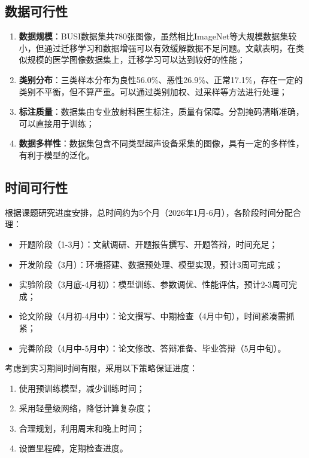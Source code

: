 \documentclass[supercite]{Hust-undergraduate-kaiti}
\theoremstyle{definition}
\begin{document}
\subsection{数据可行性}

\begin{enumerate}
    \item \textbf{数据规模}：BUSI数据集共780张图像，虽然相比ImageNet等大规模数据集较小，但通过迁移学习和数据增强可以有效缓解数据不足问题。文献表明，在类似规模的医学图像数据集上，迁移学习可以达到较好的性能；
    
    \item \textbf{类别分布}：三类样本分布为良性56.0\%、恶性26.9\%、正常17.1\%，存在一定的类别不平衡，但不算严重。可以通过类别加权、过采样等方法进行处理；
    
    \item \textbf{标注质量}：数据集由专业放射科医生标注，质量有保障。分割掩码清晰准确，可以直接用于训练；
    
    \item \textbf{数据多样性}：数据集包含不同类型超声设备采集的图像，具有一定的多样性，有利于模型的泛化。
\end{enumerate}

\subsection{时间可行性}

根据课题研究进度安排，总时间约为5个月（2026年1月-6月），各阶段时间分配合理：
\begin{itemize}
    \item 开题阶段（1-3月）：文献调研、开题报告撰写、开题答辩，时间充足；
    \item 开发阶段（3月）：环境搭建、数据预处理、模型实现，预计3周可完成；
    \item 实验阶段（3月底-4月初）：模型训练、参数调优、性能评估，预计2-3周可完成；
    \item 论文阶段（4月初-4月中）：论文撰写、中期检查（4月中旬），时间紧凑需抓紧；
    \item 完善阶段（4月中-5月中）：论文修改、答辩准备、毕业答辩（5月中旬）。
\end{itemize}

考虑到实习期间时间有限，采用以下策略保证进度：
\begin{enumerate}
    \item 使用预训练模型，减少训练时间；
    \item 采用轻量级网络，降低计算复杂度；
    \item 合理规划，利用周末和晚上时间；
    \item 设置里程碑，定期检查进度。
\end{enumerate}
\end{document}
